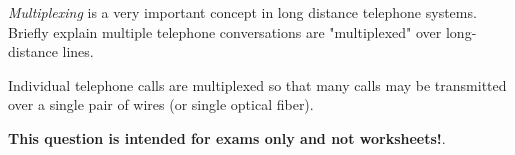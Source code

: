 

{\it Multiplexing} is a very important concept in long distance telephone systems.  Briefly explain  multiple telephone conversations are "multiplexed" over long-distance lines.







Individual telephone calls are multiplexed so that many calls may be transmitted over a single pair of wires (or single optical fiber). 







{\bf This question is intended for exams only and not worksheets!}.




